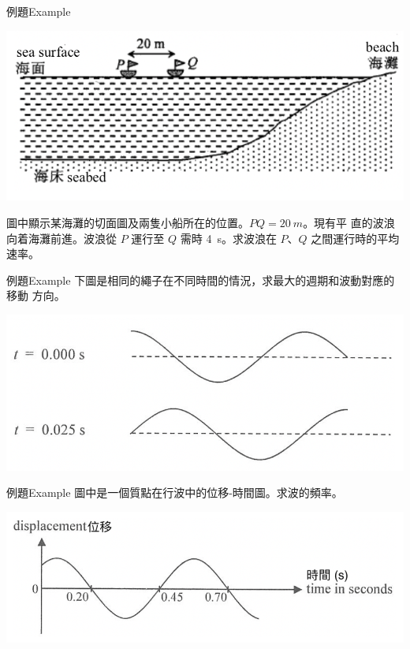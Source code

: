 \documentclass[beamer=true]{standalone}
\begin{document}
\begin{frame}[t]{例題Example}
    \par{\par\centering\includegraphics[width=.5\textwidth]{./img/ch1_2024-05-09-14-34-58.png}\par}
    圖中顯示某海灘的切面圖及兩隻小船所在的位置。$PQ= \qty{20}{m}$。現有平
    直的波浪向着海灘前進。波浪從 $P$ 運行至 $Q$ 需時 \qty{4}{s}。求波浪在 $P$、$Q$
    之間運行時的平均速率。
\end{frame}

\begin{frame}[t]{例題Example}
    下圖是相同的繩子在不同時間的情況，求最大的週期和波動對應的移動
    方向。
    \bigskip
    \par{\par\centering\includegraphics[width=.7\textwidth]{./img/ch1_2024-05-08-16-37-34.png}\par}
\end{frame}

\begin{frame}[t]{例題Example}
    圖中是一個質點在行波中的位移-時間圖。求波的頻率。
    \par{\par\centering\includegraphics[width=.66\textwidth]{./img/ch1_2024-05-08-16-40-38.png}\par}
\end{frame}
\end{document}
